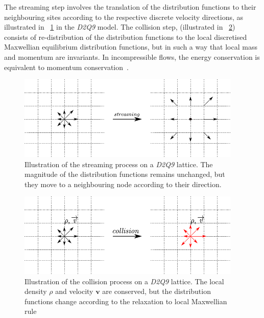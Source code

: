 The streaming step involves the translation of the distribution functions to their neighbouring sites according to the respective discrete velocity directions, as illustrated in ~\cref{fig:stream} in the \textit{D2Q9} model. 
The collision step, (illustrated in ~\cref{fig:collision}) consists of re-distribution of the distribution functions to the local discretised Maxwellian equilibrium distribution functions, but in such a way that local mass and momentum are invariants. In incompressible flows, the energy conservation is equivalent to momentum conservation~\citep{He1997}.
\begin{figure}[htpb]
\centering
\includegraphics[width=0.95\textwidth]{stream}
\caption[Illustration of the streaming process on a \textit{D2Q9} lattice]{Illustration of the streaming process on a \textit{D2Q9} lattice. The magnitude of the distribution functions remains unchanged, but they move to a neighbouring node according to their direction.}
\label{fig:stream}
\end{figure}
\begin{figure}[htbp]
\centering
\includegraphics[width=0.95\textwidth]{collision}
\caption[Illustration of the collision process on a \textit{D2Q9} lattice]{Illustration of the collision process on a \textit{D2Q9} lattice. The local density $\rho$ and velocity $\mathbf{v}$ are conserved, but the distribution functions change according to the relaxation to local Maxwellian rule}
\label{fig:collision}
\end{figure} 

